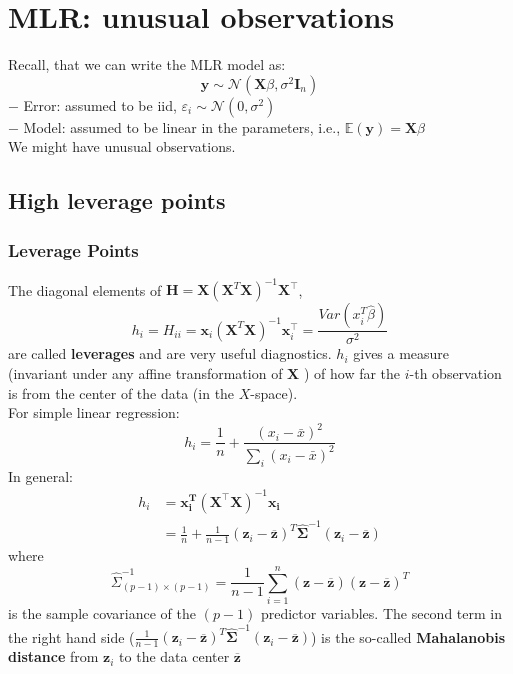 \documentclass[11pt,a4paper]{article}
\begin{document}
\section{MLR: unusual observations}
Recall, that we can write the MLR model as:
$$
\mathbf{y} \sim \mathcal{N}\left(\mathbf{X} \beta, \sigma^{2} \mathbf{I}_{n}\right)
$$
$-$ Error: assumed to be iid, $\varepsilon_{i} \sim \mathcal{N}\left(0, \sigma^{2}\right)$\\
$-$ Model: assumed to be linear in the parameters, i.e., $\mathbb{E}(\mathbf{y})=\mathbf{X} \beta$\\
We might have unusual observations.




\subsection{High leverage points}
\subsubsection{Leverage Points}
The diagonal elements of $\mathbf{H}=\mathbf{X}\left(\mathbf{X}^{T} \mathbf{X}\right)^{-1} \mathbf{X}^{\top}$,
$$
h_{i}=H_{i i}=\mathbf{x}_i\left(\mathbf{X}^{T} \mathbf{X}\right)^{-1} \mathbf{x}_i^{\top}=\frac{Var(x_i^T \hat{\beta})}{\sigma^2}
$$
are called \textbf{leverages} and are very useful diagnostics.
$h_{i}$ gives a measure (invariant under any affine transformation of $\mathbf{X}$ ) of how far the $i$-th observation is from the center of the data (in the $X$-space).\\
For simple linear regression:
$$
h_{i}=\frac{1}{n}+\frac{\left(x_{i}-\bar{x}\right)^{2}}{\sum_{i}\left(x_{i}-\bar{x}\right)^{2}}
$$
In general:
$$
\begin{aligned}
h_{i} &=\mathbf{x}_{\mathbf{i}}^{\boldsymbol{T}}\left(\mathbf{X}^{\top} \mathbf{X}\right)^{-1} \mathbf{x}_{\mathbf{i}} \\
&=\frac{1}{n}+\frac{1}{n-1}\left(\mathbf{z}_{i}-\overline{\mathbf{z}}\right)^{T} \hat{\boldsymbol{\Sigma}}^{-1}\left(\mathbf{z}_{i}-\overline{\mathbf{z}}\right)
\end{aligned}
$$
where
$$
\hat{\Sigma}_{(p-1) \times(p-1)}^{-1}=\frac{1}{n-1} \sum_{i=1}^{n}(\mathbf{z}-\overline{\mathbf{z}})(\mathbf{z}-\overline{\mathbf{z}})^{T}
$$
is the sample covariance of the $(p-1)$ predictor variables. The second term in the right hand side ($\frac{1}{n-1}\left(\mathbf{z}_{i}-\overline{\mathbf{z}}\right)^{T} \hat{\boldsymbol{\Sigma}}^{-1}\left(\mathbf{z}_{i}-\overline{\mathbf{z}}\right)$) is the so-called \textbf{Mahalanobis distance} from $\mathbf{z}_{i}$ to the data center $\overline{\mathbf{z}}$
\end{document}
